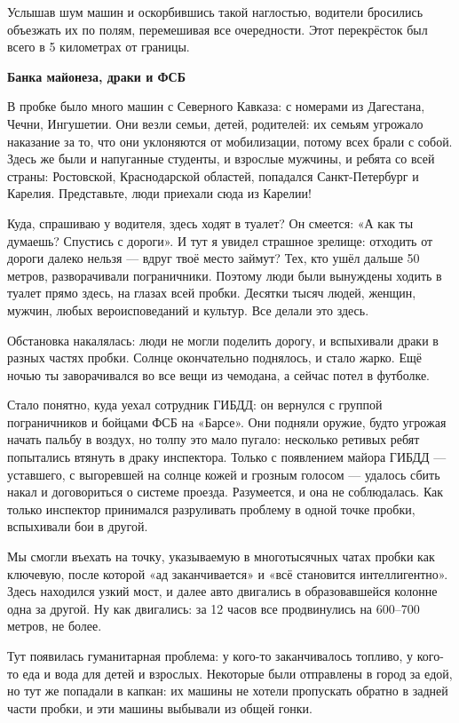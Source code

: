 Услышав шум машин и оскорбившись такой наглостью, водители бросились объезжать их по полям, перемешивая все очередности. Этот перекрёсток был всего в 5 километрах от границы.


\textbf{Банка майонеза, драки и ФСБ}

В пробке было много машин с Северного Кавказа: с номерами из Дагестана, Чечни, Ингушетии. Они везли семьи, детей, родителей: их семьям угрожало наказание за то, что они уклоняются от мобилизации, потому всех брали с собой. Здесь же были и напуганные студенты, и взрослые мужчины, и ребята со всей страны: Ростовской, Краснодарской областей, попадался Санкт-Петербург и Карелия. Представьте, люди приехали сюда из Карелии!

Куда, спрашиваю у водителя, здесь ходят в туалет? Он смеется: «А как ты думаешь? Спустись с дороги». И тут я увидел страшное зрелище: отходить от дороги далеко нельзя — вдруг твоё место займут? Тех, кто ушёл дальше 50 метров, разворачивали пограничники. Поэтому люди были вынуждены ходить в туалет прямо здесь, на глазах всей пробки. Десятки тысяч людей, женщин, мужчин, любых вероисповеданий и культур. Все делали это здесь.

Обстановка накалялась: люди не могли поделить дорогу, и вспыхивали драки в разных частях пробки. Солнце окончательно поднялось, и стало жарко. Ещё ночью ты заворачивался во все вещи из чемодана, а сейчас потел в футболке.

Стало понятно, куда уехал сотрудник ГИБДД: он вернулся с группой пограничников и бойцами ФСБ на «Барсе». Они подняли оружие, будто угрожая начать пальбу в воздух, но толпу это мало пугало: несколько ретивых ребят попытались втянуть в драку инспектора. Только с появлением майора ГИБДД — уставшего, с выгоревшей на солнце кожей и грозным голосом — удалось сбить накал и договориться о системе проезда. Разумеется, и она не соблюдалась. Как только инспектор принимался разруливать проблему в одной точке пробки, вспыхивали бои в другой.

Мы смогли въехать на точку, указываемую в многотысячных чатах пробки как ключевую, после которой «ад заканчивается» и «всё становится интеллигентно». Здесь находился узкий мост, и далее авто двигались в образовавшейся колонне одна за другой. Ну как двигались: за 12 часов все продвинулись на 600–700 метров, не более.

Тут появилась гуманитарная проблема: у кого-то заканчивалось топливо, у кого-то еда и вода для детей и взрослых. Некоторые были отправлены в город за едой, но тут же попадали в капкан: их машины не хотели пропускать обратно в задней части пробки, и эти машины выбывали из общей гонки.

